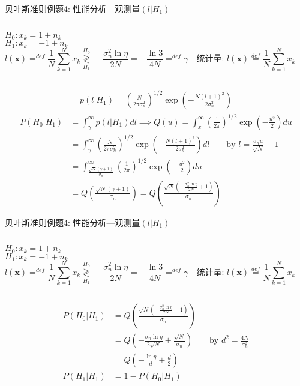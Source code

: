 \begin{frame}[shrink]{贝叶斯准则例题4: 性能分析---观测量$(l|H_1)$}
\begin{columns}
	$H_0:x_k=1+n_k$\\
	$H_1:x_k=-1+n_k$
	\[
	l(\bm{x})\mathop{=}^{def}\frac{1}{N}\sum\limits_{k=1}^{N}x_k\mathop{\gtrless}\limits_{H_1}^{H_0}-\frac{\sigma_n^2\ln\eta}{2N}=-\frac{\ln3}{4N}\mathop{=}^{def}\gamma \quad \textbf{统计量: }l(\bm{x})\mathop{=}\limits^{def}\frac{1}{N}\sum\limits_{k=1}^{N}x_k
	\]
\end{columns}
\begin{align*}
p(l|H_1)=\left(\frac{N}{2\pi\sigma_n^2}\right)^{1/2}\exp\left(-\frac{N(l+1)^2}{2\sigma_n^2}\right)
\end{align*}
\begin{align*}
P(H_0|H_1)&=\int_{\gamma}^{\infty}p(l|H_1)dl\implies Q(u)=\int_{x}^{\infty}\left(\frac{1}{2\pi}\right)^{1/2}\exp\left(-\frac{u^2}{2}\right)du\\
&=\int_{\gamma}^{\infty}\left(\frac{N}{2\pi\sigma_n^2}\right)^{1/2}\exp\left(-\frac{N(l+1)^2}{2\sigma_n^2}\right)dl\qquad \text{by } l=\frac{\sigma_nu}{\sqrt{N}}-1\\
&=\int_{\frac{\sqrt{N}(\gamma+1)}{\sigma_n}}^{\infty}\left(\frac{1}{2\pi}\right)^{1/2}\exp\left(-\frac{u^2}{2}\right)du\\
&=Q\left(\frac{\sqrt{N}(\gamma+1)}{\sigma_n}\right)=Q\left(\frac{\sqrt{N}\left(-\frac{\sigma_n^2\ln\eta}{2N}+1\right)}{\sigma_n}\right)
\end{align*}
\end{frame}

\begin{frame}[shrink]{贝叶斯准则例题4: 性能分析---观测量$(l|H_1)$}
\begin{columns}
	$H_0:x_k=1+n_k$\\
	$H_1:x_k=-1+n_k$
	\[
	l(\bm{x})\mathop{=}^{def}\frac{1}{N}\sum\limits_{k=1}^{N}x_k\mathop{\gtrless}\limits_{H_1}^{H_0}-\frac{\sigma_n^2\ln\eta}{2N}=-\frac{\ln3}{4N}\mathop{=}^{def}\gamma \quad \textbf{统计量: }l(\bm{x})\mathop{=}\limits^{def}\frac{1}{N}\sum\limits_{k=1}^{N}x_k
	\]
\end{columns}
\begin{align*}
P(H_0|H_1)&=Q\left(\frac{\sqrt{N}\left(-\frac{\sigma_n^2\ln\eta}{2N}+1\right)}{\sigma_n}\right)\\
&=Q\left(-\frac{\sigma_n\ln\eta}{2\sqrt{N}}+\frac{\sqrt{N}}{\sigma_n}\right)&& \text{by }d^2=\frac{4N}{\sigma_n^2}\\
&=Q\left(-\frac{\ln\eta}{d}+\frac{d}{2}\right)\\
P(H_1|H_1)&=1-P(H_0|H_1)
\end{align*}
\end{frame}

